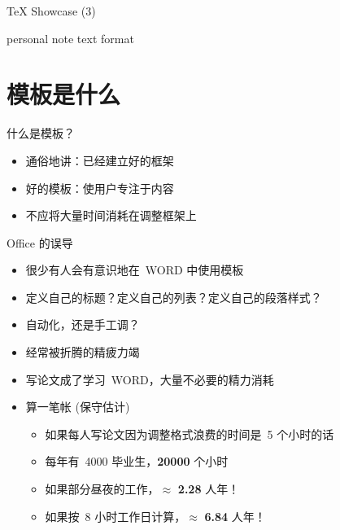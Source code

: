 \documentclass[dvipsnames, svgnames,
               mode=present, paper=screen,
               size=9pt, style=husky]{powerdot}
\begin{document}
\begin{slide}{\TeX{} Showcase (3)}
\begin{minipage}[t]{0.5\linewidth}
\hspace{2cm}
\end{minipage}
\end{slide}
\begin{note}{personal note}
text format
\end{note}

\section{模板是什么}

\begin{slide}{什么是模板？}
  \begin{itemize}
  \item 通俗地讲：已经建立好的框架
  \item 好的模板：使用户专注于内容
  \item 不应将大量时间消耗在调整框架上
  \end{itemize}
  \end{slide}

\begin{slide}{Office 的误导}  
\begin{itemize}
\item 很少有人会有意识地在~WORD 中使用模板
\item 定义自己的标题？定义自己的列表？定义自己的段落样式？
\item 自动化，还是手工调？
\item 经常被折腾的精疲力竭
\item 写论文成了学习~WORD，大量不必要的精力消耗
\item 算一笔帐 (保守估计)
  \begin{itemize}
  \item 如果每人写论文因为调整格式浪费的时间是~5 个小时的话
  \item 每年有~4000 毕业生，\textbf{20000} 个小时
  \item 如果部分昼夜的工作，$\approx$ \textbf{2.28} 人年！
  \item 如果按~8 小时工作日计算，$\approx$ \textbf{6.84} 人年！
  \end{itemize}
\end{itemize}
\end{slide}
\end{document}
